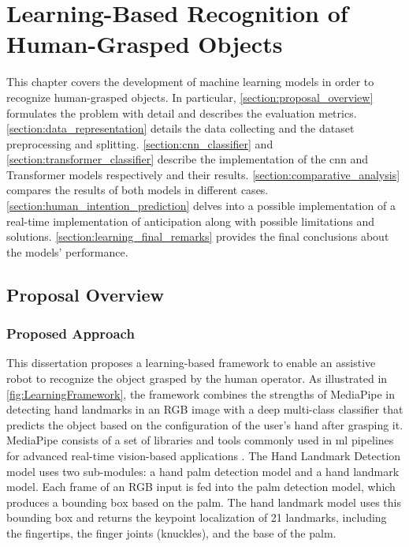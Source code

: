 \chapter{Learning-Based Recognition of Human-Grasped Objects}
\label{chapter:learning}

This chapter covers the development of machine learning models in order to recognize human-grasped objects. In particular, \autoref{section:proposal_overview} formulates the problem with detail and describes the evaluation metrics. \autoref{section:data_representation} details the data collecting and the dataset preprocessing and splitting. \autoref{section:cnn_classifier} and \autoref{section:transformer_classifier} describe the implementation of the \acs{cnn} and Transformer models respectively and their results. \autoref{section:comparative_analysis} compares the results of both models in different cases. \autoref{section:human_intention_prediction} delves into a possible implementation of a real-time implementation of anticipation along with possible limitations and solutions. \autoref{section:learning_final_remarks} provides the final conclusions about the models' performance.

\section{Proposal Overview}
\label{section:proposal_overview}

\subsection{Proposed Approach}

This dissertation proposes a learning-based framework to enable an assistive robot to recognize the object grasped by the human operator. As illustrated in \autoref{fig:LearningFramework}, the framework combines the strengths of MediaPipe in detecting hand landmarks in an RGB image with a deep multi-class classifier that predicts the object based on the configuration of the user’s hand after grasping it. MediaPipe consists of a set of libraries and tools commonly used in \acs{ml} pipelines for advanced real-time vision-based applications \cite{Lugaresi2019}. The Hand Landmark Detection model \cite{Zhang2020} uses two sub-modules: a hand palm detection model and a hand landmark model. Each frame of an RGB input is fed into the palm detection model, which produces a bounding box based on the palm. The hand landmark model uses this bounding box and returns the keypoint localization of 21 landmarks, including the fingertips, the finger joints (knuckles), and the base of the palm. 

